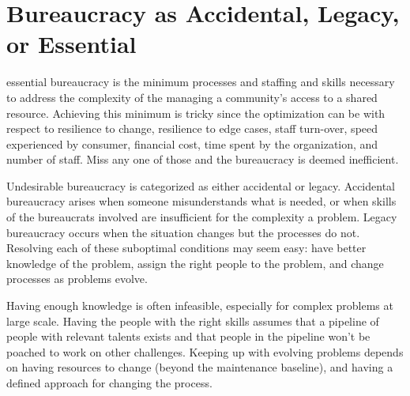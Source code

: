 \section{Bureaucracy as Accidental, Legacy, or Essential}
\gls{essential bureaucracy} is the minimum processes and staffing and skills necessary to address the complexity of the managing a community's access to a \gls{shared resource}. Achieving this minimum is tricky since the optimization can be with respect to resilience to change, resilience to edge cases, staff turn-over, speed experienced by consumer, financial cost, time spent by the organization, and number of staff. Miss any one of those and the bureaucracy is deemed inefficient.

Undesirable bureaucracy is categorized as either accidental or legacy. Accidental bureaucracy arises when someone misunderstands what is needed, or when skills of the bureaucrats involved are insufficient for the complexity a problem. Legacy bureaucracy occurs when the situation changes but the processes do not. Resolving each of these suboptimal conditions may seem easy: have better knowledge of the problem, assign the right people to the problem, and change processes as problems evolve. 

Having enough knowledge is often infeasible, especially for complex problems at large scale. Having the people with the right skills assumes that a pipeline of people with relevant talents exists and that people in the pipeline won't be poached to work on other challenges. Keeping up with evolving problems depends on having resources to change (beyond the maintenance baseline), and having a defined approach for changing the process. 